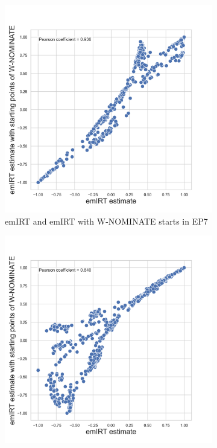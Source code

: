 \documentclass[a4paper,12pt]{report}
\begin{document}
                \begin{figure}[H]
                    \centering
                    \begin{subfigure}[b]{0.48\textwidth}
                        \centering
                        \includegraphics[width=\textwidth]{Graphs/ScatterEMEIGEN7}
                        \caption{emIRT and emIRT with W-NOMINATE starts in EP7}
                        \label{fig:EMEIGEN_SCATTER_7}
                    \end{subfigure}
                    \hfill
                    \begin{subfigure}[b]{0.48\textwidth}
                        \centering
                        \includegraphics[width=\textwidth]{Graphs/ScatterEMEIGEN8}

\end{subfigure}
\end{figure}
\end{document}
